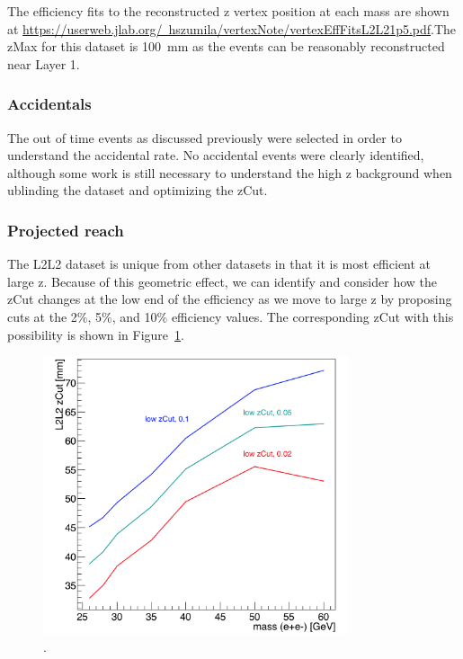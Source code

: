 \documentclass[twoside]{article}
\begin{document}
The efficiency fits to the reconstructed z vertex position at each mass are shown at  \href{url}{https://userweb.jlab.org/~hszumila/vertexNote/vertexEffFitsL2L21p5.pdf}.The zMax for this dataset is 100~mm as the events can be reasonably reconstructed near Layer 1.

\subsubsection{Accidentals}

The out of time events as discussed previously were selected in order to understand the accidental rate. No accidental events were clearly identified, although some work is still necessary to understand the high z background when ublinding the dataset and optimizing the zCut. 

\subsubsection{Projected reach}
The L2L2 dataset is unique from other datasets in that it is most efficient at large z. Because of this geometric effect, we can identify and consider how the zCut changes at the low end of the efficiency as we move to large z by proposing cuts at the 2$\%$, 5$\%$, and 10$\%$ efficiency values. The corresponding zCut with this possibility is shown in Figure~\ref{fig:L2L2_zCut_1p5}.

\begin{figure}[H]
  \centering
     \includegraphics[width=0.8\textwidth]{plots/L2L2_proposedZcut_1p5.png}
  \caption{.}
  \label{fig:L2L2_zCut_1p5}
\end{figure} 
\end{document}
